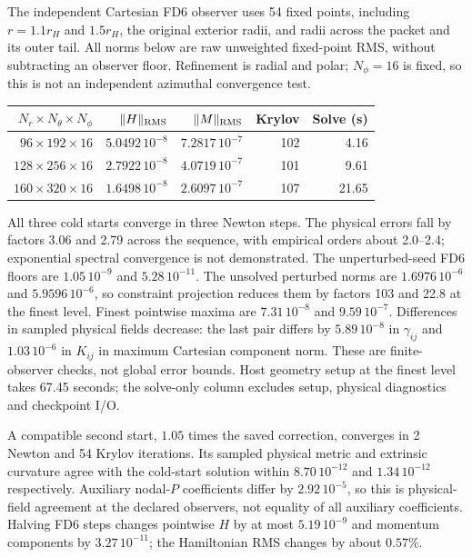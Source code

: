 \documentclass[aps,prd,preprint,notitlepage,nofootinbib]{revtex4-2}
\begin{document}
The independent Cartesian FD6 observer uses 54 fixed points, including
$r=1.1r_H$ and $1.5r_H$, the original exterior radii, and radii across the
packet and its outer tail. All norms below are raw unweighted fixed-point
RMS, without subtracting an observer floor. Refinement is radial and polar;
$N_\phi=16$ is fixed, so this is not an independent azimuthal convergence test.
\begin{center}
\begin{tabular}{rrrrr}
\toprule
$N_r\times N_\theta\times N_\phi$ & $\|H\|_{\rm RMS}$ &
$\|M\|_{\rm RMS}$ & Krylov & Solve (s)\\
\midrule
$96\times192\times16$ & $5.0492\,10^{-8}$ & $7.2817\,10^{-7}$ &102&4.16\\
$128\times256\times16$ & $2.7922\,10^{-8}$ & $4.0719\,10^{-7}$ &101&9.61\\
$160\times320\times16$ & $1.6498\,10^{-8}$ & $2.6097\,10^{-7}$ &107&21.65\\
\bottomrule
\end{tabular}
\end{center}
All three cold starts converge in three Newton steps. The physical errors
fall by factors 3.06 and 2.79 across the sequence, with empirical orders
about 2.0--2.4; exponential spectral convergence is not demonstrated.
The unperturbed-seed FD6 floors are $1.05\,10^{-9}$ and $5.28\,10^{-11}$.
The unsolved perturbed norms are $1.6976\,10^{-6}$ and $5.9596\,10^{-6}$,
so constraint projection reduces them by factors 103 and 22.8 at the finest
level. Finest pointwise maxima are $7.31\,10^{-8}$ and $9.59\,10^{-7}$.
Differences in sampled physical fields decrease: the last pair differs by
$5.89\,10^{-8}$ in $\gamma_{ij}$ and $1.03\,10^{-6}$ in $K_{ij}$ in maximum
Cartesian component norm. These are finite-observer checks, not global error
bounds. Host geometry setup at the finest level takes 67.45 seconds;
the solve-only column excludes setup, physical diagnostics and checkpoint I/O.

A compatible second start, $1.05$ times the saved correction, converges in
2 Newton and 54 Krylov iterations. Its sampled physical metric and extrinsic
curvature agree with the cold-start solution within $8.70\,10^{-12}$ and
$1.34\,10^{-12}$ respectively. Auxiliary nodal-$P$ coefficients differ by
$2.92\,10^{-5}$, so this is physical-field agreement at the declared observers,
not equality of all auxiliary coefficients. Halving FD6 steps changes
pointwise $H$ by at most $5.19\,10^{-9}$ and momentum components by
$3.27\,10^{-11}$; the Hamiltonian RMS changes by about $0.57\%$.
\end{document}
